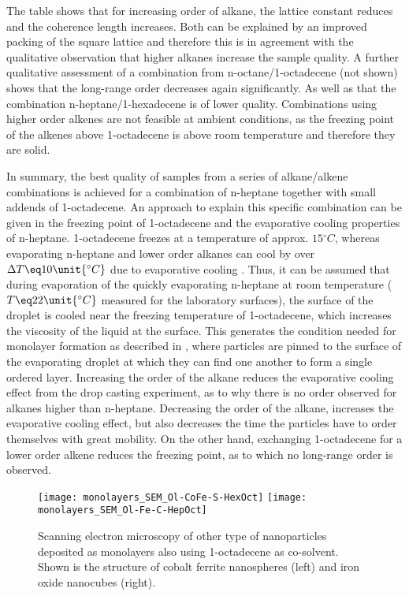 \documentclass[\main/dresen_thesis.tex]{subfiles}
\begin{document}
    The table shows that for increasing order of alkane, the lattice constant reduces and the coherence length increases.
    Both can be explained by an improved packing of the square lattice and therefore this is in agreement with the qualitative observation that higher alkanes increase the sample quality.
    A further qualitative assessment of a combination from n-octane/1-octadecene (not shown) shows that the long-range order decreases again significantly.
    As well as that the combination n-heptane/1-hexadecene is of lower quality.
    Combinations using higher order alkenes are not feasible at ambient conditions, as the freezing point of the alkenes above 1-octadecene is above room temperature and therefore they are solid.

    In summary, the best quality of samples from a series of alkane/alkene combinations is achieved for a combination of n-heptane together with small addends of 1-octadecene.
    An approach to explain this specific combination can be given in the freezing point of 1-octadecene and the evaporative cooling properties of n-heptane.
    1-octadecene freezes at a temperature of approx. $15 \unit{^\circ C}$, whereas evaporating n-heptane and lower order alkanes can cool by over $\Delta T \eq 10 \unit{^\circ C}$ due to evaporative cooling \cite{Tuckermann_2002_Evapo}.
    Thus, it can be assumed that during evaporation of the quickly evaporating n-heptane at room temperature ($T \eq 22 \unit{^\circ C}$ measured for the laboratory surfaces), the surface of the droplet is cooled near the freezing temperature of 1-octadecene, which increases the viscosity of the liquid at the surface.
    This generates the condition needed for monolayer formation as described in \cite{Bigioni_2006_Kinet}, where particles are pinned to the surface of the evaporating droplet at which they can find one another to form a single ordered layer.
    Increasing the order of the alkane reduces the evaporative cooling effect from the drop casting experiment, as to why there is no order observed for alkanes higher than n-heptane.
    Decreasing the order of the alkane, increases the evaporative cooling effect, but also decreases the time the particles have to order themselves with great mobility.
    On the other hand, exchanging 1-octadecene for a lower order alkene reduces the freezing point, as to which no long-range order is observed.

    \begin{figure}[tb]
      \centering
      \texttt{[image: monolayers\_SEM\_Ol-CoFe-S-HexOct]}
      \texttt{[image: monolayers\_SEM\_Ol-Fe-C-HepOct]}
      \caption{\label{fig:monolayers:preparation:solventVariation:spheresIron}Scanning electron microscopy of other type of nanoparticles deposited as monolayers also using 1-octadecene as co-solvent. Shown is the structure of cobalt ferrite nanospheres (left) and iron oxide nanocubes (right).}
    \end{figure}
\end{document}

